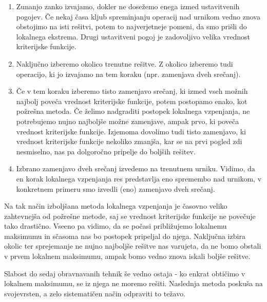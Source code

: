\documentclass[10pt,a4paper]{article}
\begin{document}
\begin{enumerate}
   \item Zunanjo zanko izvajamo, dokler ne dosežemo enega izmed ustavitvenih pogojev.
   Če nekaj časa kljub spreminjanju operacij nad urnikom vedno znova obstojimo na isti
   rešitvi, potem to najverjetneje pomeni, da smo prišli do lokalnega ekstrema. Drugi
   ustavitveni pogoj je zadovoljivo velika vrednost kriterijske funkcije.

   \item Naključno izberemo okolico trenutne rešitve. Z okolico izberemo tudi operacijo,
   ki jo izvajamo na tem koraku (npr. zamenjava dveh srečanj).

   \item Če v tem koraku izberemo tisto zamenjavo srečanj, ki izmed vseh možnih najbolj
   poveča vrednost kriterijske funkcije, potem postopamo enako, kot požrešna metoda. Če
   želimo nadgraditi postopek lokalnega vzpenjanja, ne potrebujemo nujno najboljše možne
   zamenjave, ampak prvo, ki poveča vrednost kriterijske funkcije. Izjemoma dovolimo tudi
   tisto zamenjavo, ki vrednost kriterijske funkcije nekoliko zmanjša, kar se na prvi
   pogled zdi nesmiselno, nas pa dolgoročno pripelje do boljših rešitev.

   \item Izbrano zamenjavo dveh srečanj izvedemo na trenutnem urniku. Vidimo, da en korak
   lokalnega vzpenjanja res predstavlja eno spremembo nad urnikom, v konkretnem primeru
   smo izvedli (eno) zamenjavo dveh srečanj.
   \end{enumerate}

\noindent
Na tak način izboljšana metoda lokalnega vzpenjanja je časovno veliko zahtevnejša od
požrešne metode, saj se vrednost kriterijske funkcije ne povečuje tako drastično. Vseeno
pa vidimo, da se počasi približujemo lokalnemu maksimumu in sčasoma nas bo postopek
pripeljal do njega. Naključna izbira okolic ter sprejemanje ne nujno najboljše rešitve
nas varujeta, da ne bomo obstali v prvem lokalnem maksimumu, ampak bomo vedno znova
iskali boljše rešitve.

Slabost do sedaj obravnavanih tehnik še vedno ostaja - ko enkrat obtičimo v lokalnem
maksimumu, se iz njega ne moremo rešiti. Naslednja metoda poskuša na svojevrsten, a zelo
sistematičen način odpraviti to težavo.
\end{document}
